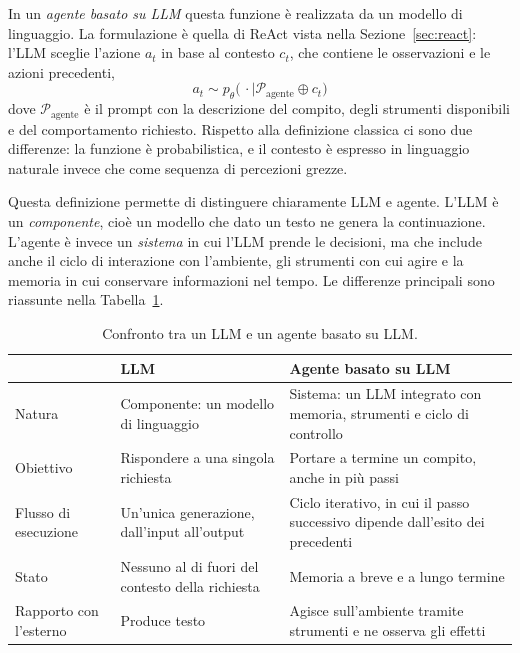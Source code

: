 In un \emph{agente basato su LLM} questa funzione è realizzata da un modello di linguaggio. La formulazione è quella di ReAct vista nella Sezione~\ref{sec:react}: l'LLM sceglie l'azione $a_t$ in base al contesto $c_t$, che contiene le osservazioni e le azioni precedenti,
\[
a_t \sim p_\theta\big(\,\cdot \mid \mathcal{P}_{\text{agente}} \oplus c_t\big)
\]
dove $\mathcal{P}_{\text{agente}}$ è il prompt con la descrizione del compito, degli strumenti disponibili e del comportamento richiesto. Rispetto alla definizione classica ci sono due differenze: la funzione è probabilistica, e il contesto è espresso in linguaggio naturale invece che come sequenza di percezioni grezze.

Questa definizione permette di distinguere chiaramente LLM e agente. L'LLM è un \emph{componente}, cioè un modello che dato un testo ne genera la continuazione. L'agente è invece un \emph{sistema} in cui l'LLM prende le decisioni, ma che include anche il ciclo di interazione con l'ambiente, gli strumenti con cui agire e la memoria in cui conservare informazioni nel tempo. Le differenze principali sono riassunte nella Tabella~\ref{tab:llm-agente}.

\begin{table}[!ht]
    \centering
    \small
    \begin{tabular}{p{3.2cm} p{5cm} p{5cm}}
        \hline
        & \textbf{LLM} & \textbf{Agente basato su LLM} \\
        \hline
        Natura & Componente: un modello di linguaggio & Sistema: un LLM integrato con memoria, strumenti e ciclo di controllo \\
        Obiettivo & Rispondere a una singola richiesta & Portare a termine un compito, anche in più passi \\
        Flusso di esecuzione & Un'unica generazione, dall'input all'output & Ciclo iterativo, in cui il passo successivo dipende dall'esito dei precedenti \\
        Stato & Nessuno al di fuori del contesto della richiesta & Memoria a breve e a lungo termine \\
        Rapporto con l'esterno & Produce testo & Agisce sull'ambiente tramite strumenti e ne osserva gli effetti \\
        \hline
    \end{tabular}
    \caption{Confronto tra un LLM e un agente basato su LLM.}
    \label{tab:llm-agente}
\end{table}

\FloatBarrier

